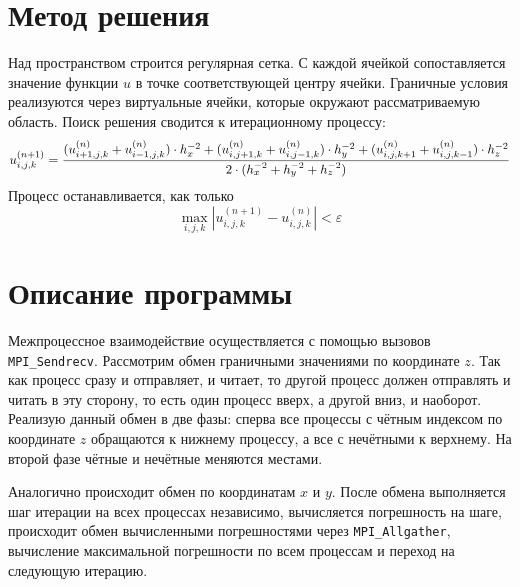 \section{Метод решения}
Над пространством строится регулярная сетка. С каждой ячейкой сопоставляется значение функции $u$ в точке соответствующей центру ячейки. Граничные условия реализуются через виртуальные ячейки, которые окружают рассматриваемую область. Поиск решения сводится к итерационному процессу:
$$ u^{(n+1)}_{i, j, k} = {{(u^{(n)}_{i + 1, j, k} + u^{(n)}_{i-1, j, k}) \cdot h^{-2}_x+(u^{(n)}_{i, j + 1, k} + u^{(n)}_{i, j - 1, k}) \cdot h^{-2}_y+(u^{(n)}_{i, j, k + 1} + u^{(n)}_{i, j, k - 1}) \cdot h^{-2}_z} \over {2 \cdot (h^{-2}_x + h^{-2}_y + h^{-2}_z)}}$$
Процесс останавливается, как только
$$\max_{i, j,k}|u^{(n+1)}_{i, j, k} - u^{(n)}_{i, j, k}| < \varepsilon$$

\section{Описание программы}
Межпроцессное взаимодействие осуществляется с помощью вызовов \texttt{MPI\_Sendrecv}. Рассмотрим обмен граничными значениями по координате $z$. Так как процесс сразу и отправляет, и читает, то другой процесс должен отправлять и читать в эту сторону, то есть один процесс вверх, а другой вниз, и наоборот. Реализую данный обмен в две фазы: сперва все процессы с чётным индексом по координате $z$ обращаются к нижнему процессу, а все с нечётными к верхнему. На второй фазе чётные и нечётные меняются местами.

Аналогично происходит обмен по координатам $x$ и $y$. После обмена выполняется шаг итерации на всех процессах независимо, вычисляется погрешность на шаге, происходит обмен вычисленными погрешностями через \texttt{MPI\_Allgather}, вычисление максимальной погрешности по всем процессам и переход на следующую итерацию.
\pagebreak